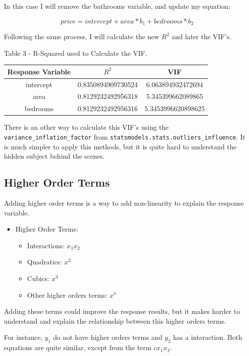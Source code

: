 \documentclass[]{book}
\providecommand{\tightlist}{%
  \setlength{\itemsep}{0pt}\setlength{\parskip}{0pt}}
\begin{document}
In this case I will remove the bathrooms variable, and update my
equation:

\[ price = intercept + area * b_1 + bedrooms * b_2 \tag{4}\]

Following the same process, I will calculate the new \(R^2\) and later
the VIF's.

Table 3 - R-Squared used to Calculate the VIF.

\begin{longtable}[]{@{}ccc@{}}
\toprule
Response Variable & \(R^2\) & VIF\tabularnewline
\midrule
\endhead
intercept & 0.8350894909730524 & 6.063894932472694\tabularnewline
area & 0.8129232492956318 & 5.345399662089865\tabularnewline
bedrooms & 0.8129232492956316 & 5.3453996620898625\tabularnewline
\bottomrule
\end{longtable}

There is an other way to calculate this VIF's using the
\texttt{variance\_inflation\_factor} from
\texttt{statsmodels.stats.outliers\_influence}. It is much simpler to
apply this methods, but it is quite hard to understand the hidden
subject behind the scenes.

\subsection{Higher Order Terms}\label{higher-order-terms}

Adding higher order terms is a way to add non-linearity to explain the
response variable.

\begin{itemize}
\tightlist
\item
  Higher Order Terms:

  \begin{itemize}
  \tightlist
  \item
    Interactions: \(x_1x_2\)
  \item
    Quadratics: \(x^2\)
  \item
    Cubics: \(x^3\)
  \item
    Other higher orders terms: \(x^n\)
  \end{itemize}
\end{itemize}

Adding these terms could improve the response results, but it makes
harder to understand and explain the relationship between this higher
orders terms.

For instance, \(y_1\) do not have higher orders terms and \(y_2\) has a
interaction. Both equations are quite similar, except from the term
\(cx_1x_2\).
\end{document}
